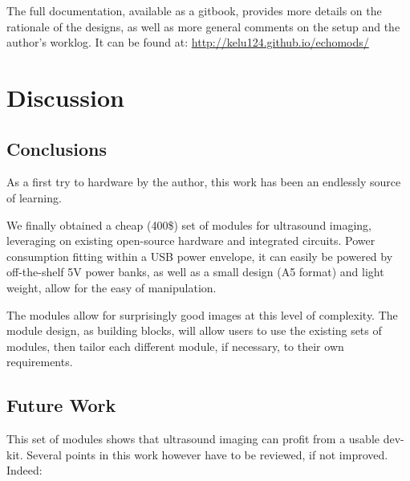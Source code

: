 \documentclass[letterpaper, 10 pt, conference]{ieeeconf} %
\begin{document}
The full documentation, available as a gitbook, provides more details on the rationale of the designs, as well as more general comments on the setup and the author's worklog. It can be found at: \url{http://kelu124.github.io/echomods/}





\section{Discussion}

\subsection{Conclusions}

As a first try to hardware by the author, this work has been an endlessly source of learning.

We finally obtained a cheap (400\$) set of modules for ultrasound imaging, leveraging on existing open-source hardware and integrated circuits.
Power consumption fitting within a USB power envelope, it can easily be powered by off-the-shelf 5V power banks, as well as a small design (A5 format) and light weight, allow for the easy of manipulation. 

The modules allow for surprisingly good images at this level of complexity. The module design, as building blocks, will allow users to use the existing sets of modules, then tailor each different module, if necessary, to their own requirements.

\subsection{Future Work}

This set of modules shows that ultrasound imaging can profit from a usable dev-kit. Several points in this work however have to be reviewed, if not improved. Indeed:
\end{document}
